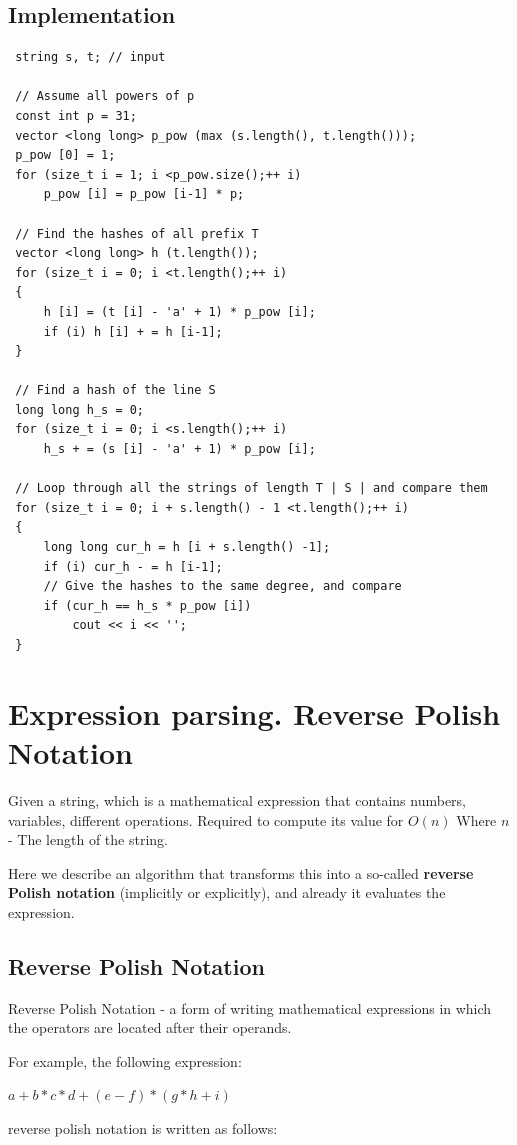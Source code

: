 \subsection{ Implementation }
\begin{verbatim}
 string s, t; // input

 // Assume all powers of p
 const int p = 31;
 vector <long long> p_pow (max (s.length(), t.length()));
 p_pow [0] = 1;
 for (size_t i = 1; i <p_pow.size();++ i)
     p_pow [i] = p_pow [i-1] * p;

 // Find the hashes of all prefix T
 vector <long long> h (t.length());
 for (size_t i = 0; i <t.length();++ i)
 {
     h [i] = (t [i] - 'a' + 1) * p_pow [i];
     if (i) h [i] + = h [i-1];
 }

 // Find a hash of the line S
 long long h_s = 0;
 for (size_t i = 0; i <s.length();++ i)
     h_s + = (s [i] - 'a' + 1) * p_pow [i];

 // Loop through all the strings of length T | S | and compare them
 for (size_t i = 0; i + s.length() - 1 <t.length();++ i)
 {
     long long cur_h = h [i + s.length() -1];
     if (i) cur_h - = h [i-1];
     // Give the hashes to the same degree, and compare
     if (cur_h == h_s * p_pow [i])
         cout << i << '';
 } 
\end{verbatim}
\section{ Expression parsing. Reverse Polish Notation }
Given a string, which is a mathematical expression that contains numbers, variables, different operations. Required to compute its value for $O (n)$ Where $n$ - The length of the string.

Here we describe an algorithm that transforms this into a so-called \textbf{reverse Polish notation} (implicitly or explicitly), and already it evaluates the expression.

\subsection{ Reverse Polish Notation }

Reverse Polish Notation - a form of writing mathematical expressions in which the operators are located after their operands.

For example, the following expression:

$a + b * c * d + (e - f) * (g * h + i)$

reverse polish notation is written as follows:

